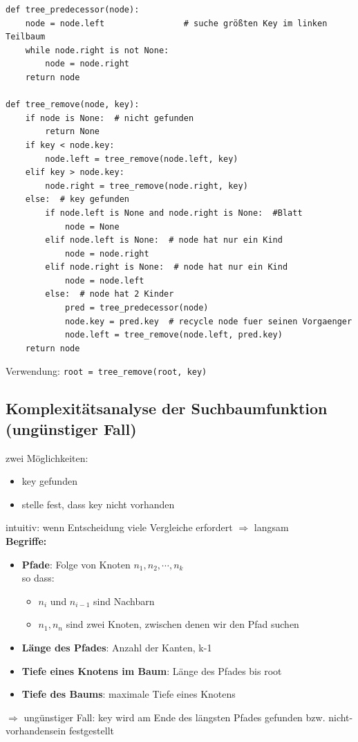 \documentclass[11pt, fleqn]{scrreprt}
\begin{document}
\begin{verbatim}
def tree_predecessor(node):
    node = node.left                # suche größten Key im linken Teilbaum
    while node.right is not None:
        node = node.right
    return node

def tree_remove(node, key):
    if node is None:  # nicht gefunden
        return None
    if key < node.key:
        node.left = tree_remove(node.left, key)
    elif key > node.key:
        node.right = tree_remove(node.right, key)
    else:  # key gefunden
        if node.left is None and node.right is None:  #Blatt
            node = None
        elif node.left is None:  # node hat nur ein Kind
            node = node.right
        elif node.right is None:  # node hat nur ein Kind
            node = node.left
        else:  # node hat 2 Kinder
            pred = tree_predecessor(node)
            node.key = pred.key  # recycle node fuer seinen Vorgaenger
            node.left = tree_remove(node.left, pred.key)
    return node
\end{verbatim}

Verwendung: \verb|root = tree_remove(root, key)|


\subsection*{Komplexitätsanalyse der Suchbaumfunktion (ungünstiger Fall)}
zwei Möglichkeiten:
\begin{itemize}
    \item key gefunden
    \item stelle fest, dass key nicht vorhanden
\end{itemize}
intuitiv: wenn Entscheidung viele Vergleiche erfordert $\Rightarrow$ langsam \\
\textbf{Begriffe:}
\begin{itemize}
    \item \textbf{Pfade}: Folge von Knoten $n_1, n_2, \cdots, n_k$ \\
    so dass:
    \begin{itemize}
        \item $n_i$ und $n_{i-1}$ sind Nachbarn
        \item $n_1, n_n$ sind zwei Knoten, zwischen denen wir den Pfad suchen
    \end{itemize}
    \item \textbf{Länge des Pfades}: Anzahl der Kanten, k-1
    \item \textbf{Tiefe eines Knotens im Baum}: Länge des Pfades bis root
    \item \textbf{Tiefe des Baums}: maximale Tiefe eines Knotens
\end{itemize}
$\Rightarrow$ ungünstiger Fall: key wird am Ende des längsten Pfades gefunden bzw. nicht-vorhandensein festgestellt
\end{document}
